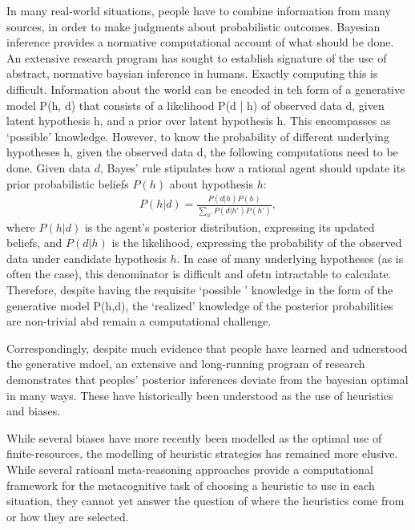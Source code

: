 In many real-world situations, people have to combine information from many sources, in order to make judgments about probabilistic outcomes. Bayesian inference provides a normative computational account of what should be done. An extensive research program has sought to establish signature of the use of abstract, normative baysian inference in humans. Exactly computing this is difficult. Information about the world can be encoded in teh form of a generative model P(h, d) that consists of a likelihood P(d | h) of observed data d, given latent hypothesis h, and a prior over latent hypothesis h. This encompasses as `possible' knowledge. However, to know the probability of different underlying hypotheses h, given the observed data d, the following computations need to be done.
Given data $d$, Bayes' rule stipulates how a rational agent should update its prior probabilistic beliefs $P(h)$ about hypothesis $h$:
\begin{align}
    P(h|d) = \frac{P(d|h)P(h)}{\sum_{h'} P(d|h') P(h')},
\end{align}
where $P(h|d)$ is the agent's posterior distribution, expressing its updated beliefs, and $P(d|h)$ is the likelihood, expressing the probability of the observed data under candidate hypothesis $h$. In case of many underlying hypotheses (as is often the case), this denominator is difficult and ofetn intractable to calculate. Therefore, despite having the requisite `possible ' knowledge in the form of the generative model P(h,d), the `realized' knowledge of the posterior probabilities are non-trivial abd remain a computational challenge.

Correspondingly, despite much evidence that people have learned and udnerstood the generative mdoel, an extensive and long-running program of research demonstrates that peoples' posterior inferences deviate from the bayesian optimal in many ways. These have historically been understood as the use of heuristics and biases.

While several biases have more recently been modelled as the optimal use of finite-resources, the modelling of heuristic strategies has remained more elusive. While several ratioanl meta-reasoning approaches provide a computational framework for the metacognitive task of choosing a heuristic to use in each situation, they cannot yet answer the question of where the heuristics come from or how they are selected.

